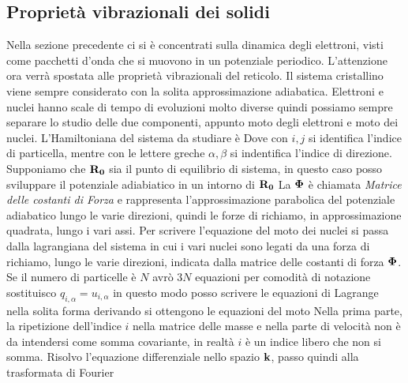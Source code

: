 \subsection{Proprietà vibrazionali dei solidi}
Nella sezione precedente ci si è concentrati sulla dinamica degli elettroni, visti come pacchetti d'onda che si muovono in un potenziale periodico. L'attenzione ora verrà spostata alle proprietà vibrazionali del reticolo. Il sistema cristallino viene sempre considerato con la solita approssimazione adiabatica. Elettroni e nuclei hanno scale di tempo di evoluzioni molto diverse quindi possiamo sempre separare lo studio delle due componenti, appunto moto degli elettroni e moto dei nuclei. L'Hamiltoniana del sistema da studiare è
Dove con $i, j$ si identifica l'indice di particella, mentre con le lettere greche $\alpha, \beta$ si indentifica l'indice di direzione.
Supponiamo che $\it\bf R_0$ sia il punto di equilibrio di sistema, in questo caso posso sviluppare il potenziale adiabiatico in un intorno di $\it\bf R_0$ 
La $\it\bf \Phi$ è chiamata \textit{Matrice delle costanti di Forza} e rappresenta l'approssimazione parabolica del potenziale adiabatico lungo le varie direzioni, quindi le forze di richiamo, in approssimazione quadrata, lungo i vari assi. Per scrivere l'equazione del moto dei nuclei si passa dalla lagrangiana del sistema in cui i vari nuclei sono legati da una forza di richiamo, lungo le varie direzioni, indicata dalla matrice delle costanti di forza $\it\bf \Phi$. Se il numero di particelle è $N$ avrò $3N$ equazioni 
per comodità di notazione sostituisco $q_{i,\alpha} = u_{i,\alpha}$ in questo modo posso scrivere le equazioni di Lagrange nella solita forma
derivando si ottengono le equazioni del moto
Nella prima parte, la ripetizione dell'indice $i$ nella matrice delle masse e nella parte di velocità non è da intendersi come somma covariante, in realtà $i$ è un indice libero che non si somma. Risolvo l'equazione differenziale nello spazio $\it\bf k$, passo quindi alla trasformata di Fourier 
